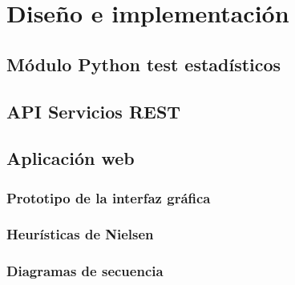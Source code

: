 \chapter{Diseño e implementación}
\section{Módulo Python test estadísticos}
\section{API Servicios REST}
\section{Aplicación web}
\subsection{Prototipo de la interfaz gráfica}
\subsection{Heurísticas de Nielsen}
\subsection{Diagramas de secuencia}